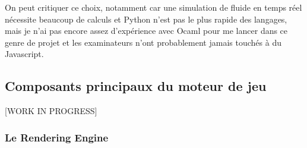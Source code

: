 \documentclass[a4paper,10pt]{report}
\begin{document}
On peut critiquer ce choix, notamment car une simulation de fluide en temps réel nécessite beaucoup de calculs et Python n'est pas le plus rapide des langages, mais je n'ai pas encore assez d'expérience avec Ocaml pour me lancer dans ce genre de projet et les examinateurs n'ont probablement jamais touchés à du Javascript.

\subsection{Composants principaux du moteur de jeu}
[WORK IN PROGRESS]

\subsubsection{Le Rendering Engine}
\end{document}

